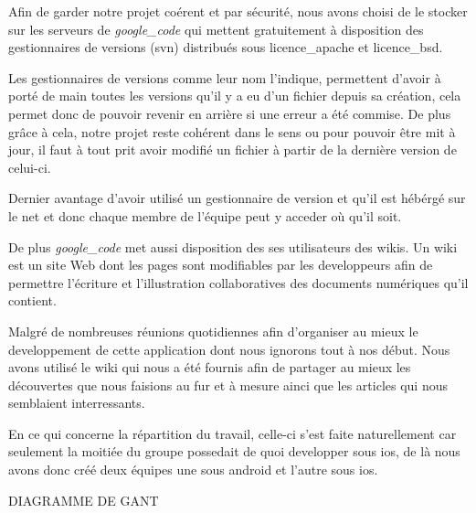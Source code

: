 		Afin de garder notre projet coérent et par sécurité, nous avons choisi de le
		stocker sur les serveurs de \emph{\gls{google_code}} qui mettent gratuitement à
		disposition des gestionnaires de versions (\gls{svn})
		distribués sous \gls{licence_apache} et \gls{licence_bsd}.
		
		Les gestionnaires de versions comme leur nom l'indique, permettent d'avoir à
		porté de main toutes les versions qu'il y a eu d'un fichier depuis sa
		création, cela permet donc de pouvoir revenir en arrière si une erreur a été commise.
		De plus grâce à cela, notre projet reste cohérent dans le sens ou pour pouvoir
		être mit à jour, il faut à tout prit avoir modifié un fichier à partir de la
		dernière version de celui-ci.
		
		Dernier avantage d'avoir utilisé un gestionnaire de version et qu'il est
		hébérgé sur le net et donc chaque membre de l'équipe peut y acceder où qu'il
		soit. 
		
		De plus \emph{\gls{google_code}} met aussi disposition des ses utilisateurs des \glspl{wiki}.
		Un \gls{wiki} est un site Web dont les pages sont modifiables par les developpeurs
		afin de permettre l'écriture et l'illustration collaboratives des documents numériques qu'il contient.
		
		Malgré de nombreuses réunions quotidiennes afin d'organiser au mieux le developpement de cette application dont nous ignorons
		tout à nos début. Nous avons utilisé le \gls{wiki} qui nous a été fournis afin de partager au mieux
		les découvertes que nous faisions au fur et à mesure ainci que les articles qui nous semblaient interressants.
		
		En ce qui concerne la répartition du travail, celle-ci s'est faite naturellement car
		seulement la moitiée du groupe possedait de quoi developper sous \gls{ios}, de là nous avons
		donc créé deux équipes une sous \gls{android} et l'autre sous \gls{ios}.
		
		
		DIAGRAMME DE GANT